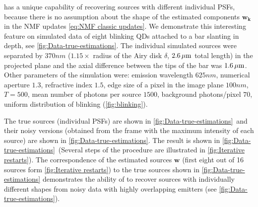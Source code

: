 \inmf{} has a unique capability of recovering sources with different individual PSFs, because there is no assumption about the shape of the estimated components $\bm{w_k}$ in the NMF updates \autoref{eq:NMF classic updates}. We demonstrate this interesting feature on simulated data of eight blinking QDs attached to a bar slanting in depth, see \autoref{fig:Data-true-estimations}\aaa. The individual simulated sources were separated by $370 \unit{nm}$ ($1.15\times$ radius of the Airy disk $\delta$, $2.6 \, \mathrm{\mu m}$ total length) in the projected plane and the axial difference between the tips of the bar was $1.6 \, \mathrm{\mu m}$. Other parameters of the simulation were: emission wavelength $625\unit{nm}$, numerical aperture $1.3$, refractive index $1.5$, edge size of a pixel in the image plane $100 \unit{nm}$, $T=500$, mean number of photons per source $1500$, background photons/pixel $70$, uniform distribution of blinking (\autoref{fig:blinking}\aaa). 

The true sources (individual PSFs) are shown in \autoref{fig:Data-true-estimations}\bbb\ and their noisy versions (obtained from the frame with the maximum intensity of each source) are shown in \autoref{fig:Data-true-estimations}\ccc. The \inmf{} result is shown in \autoref{fig:Data-true-estimations}\ddd\ (Several steps of the procedure are illustrated in \autoref{fig:Iterative restarts}). The correspondence of the estimated sources $\bm{w}$ (first eight out of 16 sources form \autoref{fig:Iterative restarts}) to the true sources shown in \autoref{fig:Data-true-estimations} demonstrates the ability of \inmf{} to recover sources with individually different shapes from noisy data with highly overlapping emitters (see \autoref{fig:Data-true-estimations}). 

